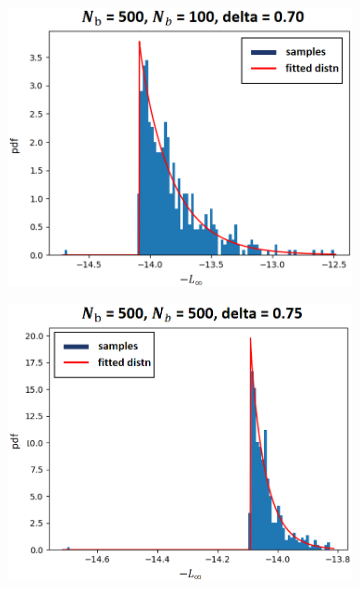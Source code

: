 \documentclass[conference]{IEEEtran}
\begin{document}
\begin{figure}[htbp]
  \centering
  \begin{subfigure}[b]{0.15\textwidth}
    \includegraphics[width=\textwidth]
    {figures/experiment 1/pathtracking/pathtrack 500x100 10step}
    \caption{}
  \end{subfigure}
  \begin{subfigure}[b]{0.15\textwidth}
    \includegraphics[width=\textwidth]
    {figures/experiment 1/pathtracking/pathtrack 500x500 10step}
    \caption{}
  \end{subfigure}

\end{figure}
\end{document}
